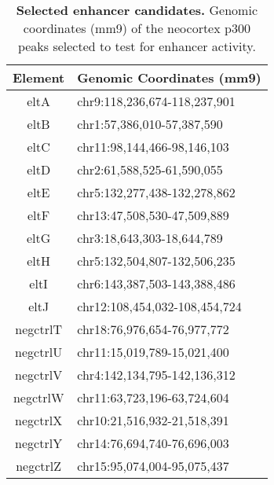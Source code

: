 \begin{table}[htbp]
\label{tab:ncxTableS1}
\begin{center}
{
\begin{tabular}{c|l}
Element & Genomic Coordinates (mm9)\\
\hline
eltA & chr9:118,236,674-118,237,901\\
eltB & chr1:57,386,010-57,387,590\\
eltC & chr11:98,144,466-98,146,103\\
eltD & chr2:61,588,525-61,590,055\\
eltE & chr5:132,277,438-132,278,862\\
eltF & chr13:47,508,530-47,509,889\\
eltG & chr3:18,643,303-18,644,789\\
eltH & chr5:132,504,807-132,506,235\\
eltI & chr6:143,387,503-143,388,486\\
eltJ & chr12:108,454,032-108,454,724\\
negctrlT & chr18:76,976,654-76,977,772\\
negctrlU & chr11:15,019,789-15,021,400\\
negctrlV & chr4:142,134,795-142,136,312\\
negctrlW & chr11:63,723,196-63,724,604\\
negctrlX & chr10:21,516,932-21,518,391\\
negctrlY & chr14:76,694,740-76,696,003\\
negctrlZ & chr15:95,074,004-95,075,437\\
\end{tabular}
}
\caption[Selected enhancer candidates] {
{\bf Selected enhancer candidates.}
Genomic coordinates (mm9) of the neocortex p300 peaks selected to test for enhancer activity.
}
\end{center}
\end{table}
